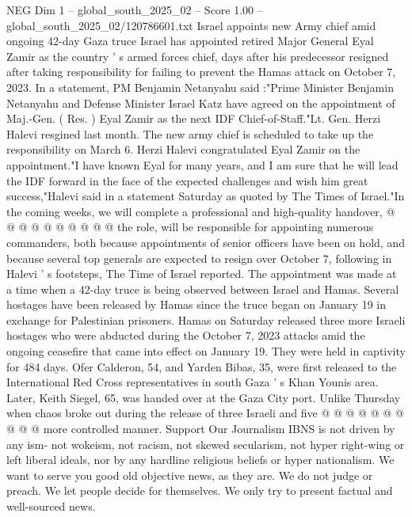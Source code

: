 \begin{textsample}{NEG Dim 1 – global\_south\_2025\_02 – Score 1.00 – global\_south\_2025\_02/120786601.txt}  \label{ex:f1_neg_091}
Israel appoints new Army chief amid ongoing 42-day Gaza truce Israel has appointed retired Major General Eyal Zamir as the country ' s armed forces chief, days after his predecessor resigned after taking responsibility for failing to prevent the Hamas attack on October 7, 2023.
In a statement, PM Benjamin Netanyahu said :"Prime Minister Benjamin Netanyahu and Defense Minister Israel Katz have agreed on the appointment of Maj.-Gen. ( Res. ) Eyal Zamir as the next IDF Chief-of-Staff."Lt.
Gen.
Herzi Halevi resgined last month.
The new army chief is scheduled to take up the responsibility on March 6.
Herzi Halevi congratulated Eyal Zamir on the appointment."I have known Eyal for many years, and I am sure that he will lead the IDF forward in the face of the expected challenges and wish him great success,"Halevi said in a statement Saturday as quoted by The Times of Israel."In the coming weeks, we will complete a professional and high-quality handover, @ @ @ @ @ @ @ @ @ @ the role, will be responsible for appointing numerous commanders, both because appointments of senior officers have been on hold, and because several top generals are expected to resign over October 7, following in Halevi ' s footsteps, The Time of Israel reported.
The appointment was made at a time when a 42-day truce is being observed between Israel and Hamas.
Several hostages have been released by Hamas since the truce began on January 19 in exchange for Palestinian prisoners.
Hamas on Saturday released three more Israeli hostages who were abducted during the October 7, 2023 attacks amid the ongoing ceasefire that came into effect on January 19.
They were held in captivity for 484 days.
Ofer Calderon, 54, and Yarden Bibas, 35, were first released to the International Red Cross representatives in south Gaza ' s Khan Younis area.
Later, Keith Siegel, 65, was handed over at the Gaza City port.
Unlike Thursday when chaos broke out during the release of three Israeli and five @ @ @ @ @ @ @ @ @ @ more controlled manner.
Support Our Journalism IBNS is not driven by any ism- not wokeism, not racism, not skewed secularism, not hyper right-wing or left liberal ideals, nor by any hardline religious beliefs or hyper nationalism.
We want to serve you good old objective news, as they are.
We do not judge or preach.
We let people decide for themselves.
We only try to present factual and well-sourced news.

\end{textsample}
